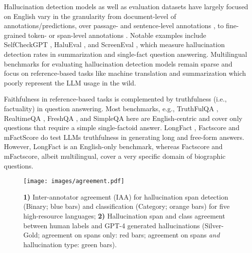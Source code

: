 
%
Hallucination detection models as well as evaluation datasets have largely focused on English vary in the granularity from document-level \citep{yang2023new} of annotations/predictions, over passage- and sentence-level annotations \citep{zhou2021detecting, manakul-etal-2023-selfcheckgpt}, to fine-grained token- or span-level annotations \citep{liu-etal-2022-token, mishra2024finegrained}. Notable examples include SelfCheckGPT \citep{manakul-etal-2023-selfcheckgpt}, HaluEval \citep{li2023halueval}, and ScreenEval \citep{lattimer2023fast}, which measure hallucination detection rates in summarization and single-fact question answering. Multilingual benchmarks for evaluating hallucination detection models remain sparse and focus on reference-based tasks like machine translation \citep{dale2023halomi} and summarization \citep{qiu-etal-2023-detecting} which poorly represent the LLM usage in the wild.   

Faithfulness in reference-based tasks is complemented by truthfulness (i.e., factuality) in question answering. 
Most benchmarks, e.g., TruthFulQA \cite{lin2022truthfulqa}, RealtimeQA \cite{kasai2024realtime}, FreshQA \cite{vu2023freshllms}, and SimpleQA \cite{wei2024measuring} here are English-centric and cover only questions that require a simple single-factoid answer. 
LongFact \citep{wei2024long}, Factscore \citep{min2023factscore} and mFactScore \cite{kim-etal-2024-analysis} do test LLMs truthfulness in generating long and free-form answers. However, LongFact is an English-only benchmark, whereas Factscore and mFactscore, albeit multilingual, cover a very specific domain of biographic questions. 

\begin{figure}[t]
    \centering
    \texttt{[image: images/agreement.pdf]}
    \caption{\textbf{1)} Inter-annotator agreement (IAA) for hallucination span detection (Binary; blue bars) and classification (Category; orange bars) for five high-resource languages; \textbf{2)} Hallucination span and class agreement between human labels and GPT-4 generated hallucinations (Silver-Gold; agreement on spans only: red bars; agreement on spans \textit{and} hallucination type: green bars).}
    \label{fig:agreement-metrics}
    \vspace{-0.5em}
\end{figure}